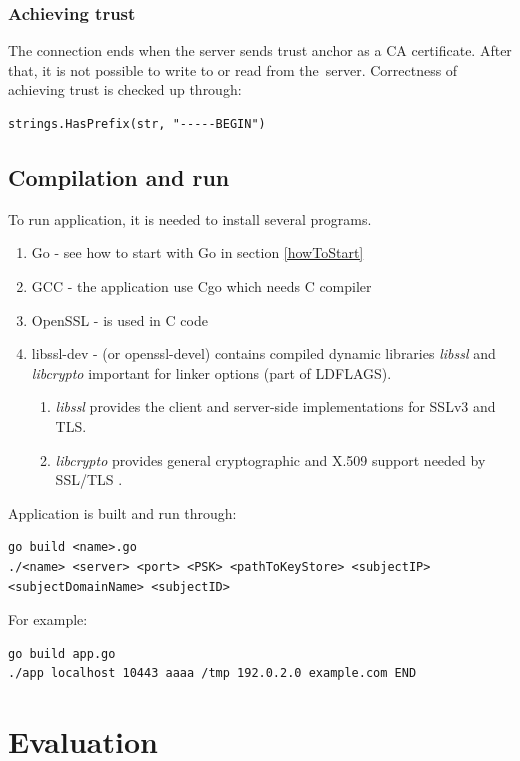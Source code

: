 \documentclass[
  twoside, 12pt, 
  printed, %
  notable,   %
  lof,     %
  lot,     %
]{fithesis3}
\begin{document}
\subsection{Achieving trust}
The connection ends when the server sends trust anchor as a CA certificate. After that, it is not 
possible to write to or read from the~server. Correctness of achieving trust is checked up 
through:
\begin{lstlisting}
strings.HasPrefix(str, "-----BEGIN")
\end{lstlisting}

\section{Compilation and run}
To run application, it is needed to install several programs.
\begin{enumerate}
\item Go - see how to start with Go in section \ref{howToStart}
\item GCC - the application use Cgo which needs C compiler
\item OpenSSL - is used in C code
\item libssl-dev - (or openssl-devel) contains compiled dynamic libraries \textit{libssl} and \textit{libcrypto} important for linker options (part of LDFLAGS). 
\begin{enumerate}
  \item \textit{libssl} provides the client and server-side implementations for SSLv3 and TLS.
  \item \textit{libcrypto} provides general cryptographic and X.509 support needed by SSL/TLS \cite{opensslgit}.
\end{enumerate}
\end{enumerate}

Application is built and run through:
\begin{lstlisting}
go build <name>.go
./<name> <server> <port> <PSK> <pathToKeyStore> <subjectIP> <subjectDomainName> <subjectID>
\end{lstlisting}

For example:
\begin{lstlisting}
go build app.go
./app localhost 10443 aaaa /tmp 192.0.2.0 example.com END
\end{lstlisting}

\nocite{linux-man}
\nocite{foundation}

\chapter{Evaluation}
\end{document}
